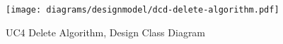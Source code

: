 \begin{figure}[p]%
\end{figure}
\begin{figure}[H]
    \centering
    \texttt{[image: diagrams/designmodel/dcd-delete-algorithm.pdf]}
    \caption{UC4 Delete Algorithm, Design Class Diagram}
    \label{fig:delete-algorithm-dcd}
\end{figure}
% 
